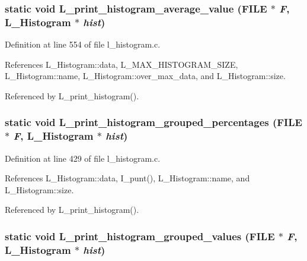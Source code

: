 \subsubsection{\setlength{\rightskip}{0pt plus 5cm}static void L\_\-print\_\-histogram\_\-average\_\-value (FILE $\ast$ {\em F}, \bf{L\_\-Histogram} $\ast$ {\em hist})\hspace{0.3cm}{\tt  [static]}}\label{l__histogram_8c_4341d96dfcf721f272a0e7cdb6ee4fd4}




Definition at line 554 of file l\_\-histogram.c.

References L\_\-Histogram::data, L\_\-MAX\_\-HISTOGRAM\_\-SIZE, L\_\-Histogram::name, L\_\-Histogram::over\_\-max\_\-data, and L\_\-Histogram::size.

Referenced by L\_\-print\_\-histogram().
\subsubsection{\setlength{\rightskip}{0pt plus 5cm}static void L\_\-print\_\-histogram\_\-grouped\_\-percentages (FILE $\ast$ {\em F}, \bf{L\_\-Histogram} $\ast$ {\em hist})\hspace{0.3cm}{\tt  [static]}}\label{l__histogram_8c_8ce9bf71a7dc14c367fffa53eea2dee4}




Definition at line 429 of file l\_\-histogram.c.

References L\_\-Histogram::data, I\_\-punt(), L\_\-Histogram::name, and L\_\-Histogram::size.

Referenced by L\_\-print\_\-histogram().
\subsubsection{\setlength{\rightskip}{0pt plus 5cm}static void L\_\-print\_\-histogram\_\-grouped\_\-values (FILE $\ast$ {\em F}, \bf{L\_\-Histogram} $\ast$ {\em hist})\hspace{0.3cm}{\tt  [static]}}\label{l__histogram_8c_c9ac124db3832f738e15c73a57c985e6}




